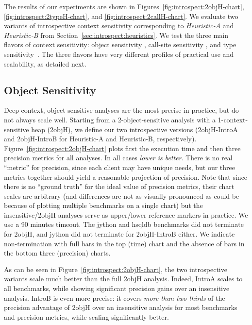 The results of our experiments are shown in Figures~\ref{fig:introspect:2objH-chart}, \ref{fig:introspect:2typeH-chart}, and \ref{fig:introspect:2callH-chart}. We evaluate two variants of introspective context sensitivity corresponding to \emph{Heuristic-A} and \emph{Heuristic-B} from Section~\ref{sec:introspect:heuristics}. We test the three main flavors of context sensitivity: object sensitivity \cite{issta:2002:Milanova,article:2005:Milanova}, call-site sensitivity \cite{col:1981:Sharir,thesis:Shivers}, and type sensitivity~\cite{popl:2011:Smaragdakis}. The three flavors have very different profiles of practical use and scalability, as detailed next.


\subsection{Object Sensitivity}
Deep-context, object-sensitive analyses are the most precise in practice, but do not always scale well. Starting from a 2-object-sensitive analysis with a 1-context-sensitive heap (2objH), we define our two introspective versions (2objH-IntroA and 2objH-IntroB for Heuristic-A and Heuristic-B, respectively). Figure~\ref{fig:introspect:2objH-chart} plots first the execution time and then three precision metrics for all analyses. In all cases \emph{lower is better}. There is no real ``metric'' for precision, since each client may have unique needs, but our three metrics together should yield a reasonable projection of precision. Note that since there is no ``ground truth'' for the ideal value of precision metrics, their chart scales are arbitrary (and differences are not as visually pronounced as could be because of plotting multiple benchmarks on a single chart) but the insensitive/2objH analyses serve as upper/lower reference markers in practice. We use a 90 minutes timeout. The jython and hsqldb benchmarks did not terminate for 2objH, and jython did not terminate for 2objH-IntroB either. We indicate non-termination with full bars in the top (time) chart and the absence of bars in the bottom three (precision) charts.

As can be seen in Figure~\ref{fig:introspect:2objH-chart}, the two introspective variants scale much better than the full 2objH analysis. Indeed, IntroA scales to all benchmarks, while showing significant precision gains over an insensitive analysis. IntroB is even more precise: it covers \emph{more than two-thirds} of the precision advantage of 2objH over an insensitive analysis for most benchmarks and precision metrics, while scaling significantly better.


